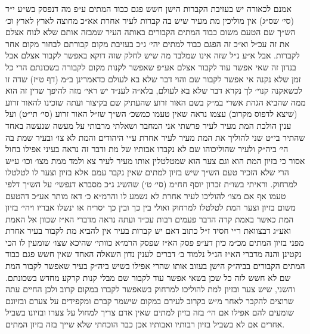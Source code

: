\documentclass[12pt, openany]{book}
\begin{document}
\begin{multicols}{2}
אמנם לכאורה יש בעזיבת הקברות הישן חשש פגם כבוד המתים ע״פ מה דנפסק בש״ע י״ד (סי׳ שס״ג) אין מוליכין מת מעיר שיש בה קברות לעיר אחרת אא״כ מחוצה לארץ לארץ וכ׳ הש״ך שם הטעם משום כבוד המתים הקבורים באותה העיר שמבזה אותם שלא לנוח אצלם את זה עכ״ל וא״כ זה הפגם כבוד למתים יהי׳ ג״כ בעזיבת מקום קבורתם לבחור מקום אחר לקברות. אבל א״ע נ״ל שזה אינו שמלבד מה שיש לחלק שזה דוקא באפשר לקבור אצלם אבל בנדון זה שאי אפשר עוד לקבור אצלם אע״פ שאפשר לקנות מקום לקבורה בשכונתם הרי כל זמן שלא נקנה אי אפשר לקבור שם והוי דבר שלא בא לעולם כדאמרינן ב״מ (דף ט״ז) שדה זו לכשאקנה קנוי׳ לך נקרא דבר שלא בא לעולם, בלא״ה לענ״ד יש ראי׳ מזה להיפך שדין זה הוא ממה שהביא הגהת אשרי במ״ק בשם האור זרוע שהעתיק שם בקיצור ועתה שזכינו להאור זרוע (שיצא לדפוס מקרוב) עצמו נראה שאין טעמו כמשכ׳ הש״ך שז״ל האור זרוע (סי׳ תי״ט) ועל ענין הולכת המת מעיר לעיר פרשתי אני המחבר ושאלתי מרבותי על מעשה שנעשה באחד שהתיר בי״ט שני להוליך את המת מעיר לעיר אחרת ע״י היהודים והמת לא צו׳ ובעיר שמת בה הי׳ ביה״ק ולעיר שהוליכוהו שם לא נקברו אבותיו של מת ודבר זה נראה בעיני אפילו בחול אסור כי בזיון המת הוא וגם צער הוא שמטלטלין אותו מעיר לעיר צא ולמד ממת מצו׳ וכו׳ ע״ש הרי שלא הזכיר טעם הש״ך שיש בזיון למתים שאין נקבר עמם אלא בזיון וצער לו לטלטלו למרחוק. וראיתי בשו״ת זכרון יוסף חח״מ (סי׳ ט׳) שהשיג ג״כ מסברא דנפשי׳ על הש״ך דלפי טעמו אף אם מצו׳ להוליכו לעיר אחרת לא נשמע לו והרמ״א כ׳ דאז מותר אע״כ דהטעם משום בזיון וצער המת לטלטלו למרחוק ואולי בין כך ובין כך יסריח או ינשלו אבריו ויהי׳ בזיון המת כאשר באמת קרה הדבר פעמים רבות עכ״ד ועתה נראה מדברי הא״ז שכוון אל האמת ואע״ג דבצוואת ר״י חסיד ז״ל כתוב דאם יש קברות בעיר אין להביא מת לקבור בעיר אחרת מפני בזיון המתים מכ״מ כיון דע״פ פסק הא״ז שפסק הרמ״א כוותי׳ שהיכא שצו׳ שומעין לו הכי נקטינן והנה מדברי הא״ז הנ״ל נלמוד ב׳ דברים לענין נדון השאלה האחד שאין חשש פגם כבוד המתים הקבורים בביה״ק הישן בעזוב אותו שהרי אפילו בשיש ביה״ק בעיר שאפשר לקבור המת שם לא חשש לזה כל שכן בשאי אפשר עוד לקבור שם מבלי קנות קרקע מחדש בשכונתם. והשני, שיש צער ובזיון למת להוליכו למרחוק בשאפשר לקברו במקום קרוב ולכן החיים עתה שרוצים להקבר לאחר מ״ש בקרוב לעירם במקום שישמר קברם ומקפידים על צערם ובזיונם שומעים להם אפילו אם הי׳ בזה בזיון למתים שאין אדם צריך למחול על צערו ובזיונו בשביל אחרים אם לא בשביל בזיון רבותיו ואבותיו אכן כבר הוכחתי שלא שייך בזה בזיון המתים.\\\vspace{0pt}


\end{multicols}
\end{document}
